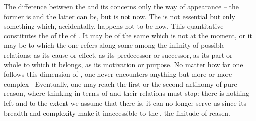 The difference between the 
 and its  concerns only the way of appearance -- the 
former is  and the latter can be, but is not now.
The  is not essential  but only something which,
accidentally, happens not to be  now. 
This quantitative  constitutes the  of
the  of .  It may be  of the same
 which is not  at the moment, or it may be
  to which the  one refers along
some among the infinity of possible relations: as its cause or effect,
as its predecessor or successor, as its part or whole to which it
belongs, as its motivation or purpose.  No matter how far one follows
this dimension of , one never encounters anything but
more  or more complex .  Eventually, one
may reach the first or the second antinomy of pure reason, where
thinking in terms of  and their relations must stop:
there is nothing  left and to the extent we assume that there
is, it can no longer serve us since its breadth and complexity make it
inaccessible to the , the finitude of
reason.

